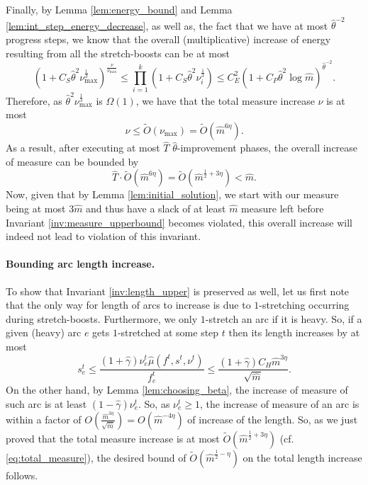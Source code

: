 \documentclass[11pt, letterpaper]{article}
\newcommand{\cendecrease}{C_{P}}
\newcommand{\cenergy}{C_{E}}
\newcommand{\cheavy}{C_{H}}
\newcommand{\cincrease}{C_{S}}
\newcommand{\tO}[1]{\widetilde{O}(#1)}
\newcommand{\hm}{\widehat{m}}
\newcommand{\hT}{\widehat{T}}
\newcommand{\hmu}{\hat{\mu}}
\newcommand{\hgamma}{\hat{\gamma}}
\newcommand{\htheta}{\hat{\theta}}
\newcommand{\vnu}{\boldsymbol{\mathit{\nu}}}
\newcommand{\ff}{\boldsymbol{\mathit{f}}}
\renewcommand{\ss}{\boldsymbol{\mathit{s}}}
\begin{document}
Finally, by Lemma \ref{lem:energy_bound} and Lemma \ref{lem:int_step_energy_decrease}, as well as, the fact that we have at most $\htheta^{-2}$ progress steps, we know that the overall (multiplicative) increase of energy resulting from all the stretch-boosts can be at most
\[
(1+\cincrease\htheta^{2}\nu_{\max}^{\frac{1}{3}})^{\frac{\nu}{\nu_{\max}}}\leq \prod_{i=1}^{k} (1+\cincrease\htheta^{2}\nu_i^{\frac{1}{3}}) \leq \cenergy^2 (1+\cendecrease \htheta^2 \log \hm)^{\htheta^{-2}}.
\]
Therefore, as $\htheta^{2}\nu_{\max}^{\frac{1}{3}}$ is $\Omega(1)$, we have that the total measure increase $\nu$ is at most
\begin{equation}
\label{eq:measure_increase_phase}
\nu \leq \tO{\nu_{\max}}=\tO{\hm^{6\eta}}.
\end{equation} 
As a result, after executing at most $\hT$ $\htheta$-improvement phases, the overall increase of measure can be bounded by
\begin{equation}\label{eq:total_measure}
\hT \cdot \tO{\hm^{6\eta}} =\tO{\hm^{\frac{1}{2}+3\eta}} < \hm.
\end{equation}
Now, given that by Lemma \ref{lem:initial_solution}, we start with our measure being at most $3\hm$ and thus have a slack of at least $\hm$ measure left before Invariant \ref{inv:measure_upperbound} becomes violated, this overall increase will indeed not lead to violation of this invariant.

\paragraph{Bounding arc length increase.} To show that Invariant \ref{inv:length_upper} is preserved as well, let us first note that the only way for length of arcs to increase is due to $1$-stretching occurring during stretch-boosts. Furthermore, we only $1$-stretch an arc if it is heavy. So, if a given (heavy) arc $e$ gets $1$-stretched at some step $t$ then its length increases by at most
\[
s_e^t \leq \frac{(1+\hgamma) \nu_e^t\hmu(\ff^t,\ss^t,\vnu^t)}{f_e^t} \leq \frac{(1+\hgamma)\cheavy \hm^{3\eta}}{\sqrt{\hm}}.
\] 
On the other hand, by Lemma \ref{lem:choosing_beta}, the increase of measure of such arc is at least $(1-\hgamma)\nu_e^t$. So, as $\nu_e^t\geq 1$, the increase of measure of an arc is within a factor of $O(\frac{\hm^{3\eta}}{\sqrt{\hm}})=O(\hm^{-4\eta})$ of increase of the length. So, as we just proved that the total measure increase is at most $\tO{\hm^{\frac{1}{2}+3\eta}}$ (cf. \eqref{eq:total_measure}), the desired bound of $\tO{\hm^{\frac{1}{2}-\eta}}$ on the total length increase follows. 
\end{document}
